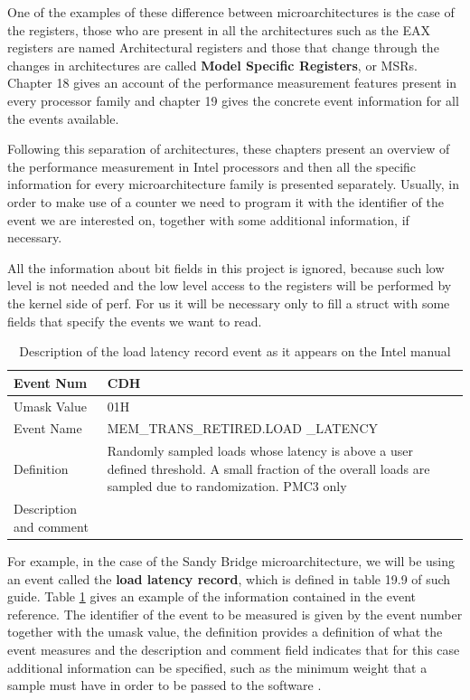 One of the examples of these difference between microarchitectures is the case of the registers, those who are present in all the architectures such as the EAX registers are named Architectural registers and those that change through the changes in architectures are called \textbf{Model Specific Registers}, or MSRs. Chapter 18 gives an account of the performance measurement features present in every processor family and chapter 19 gives the concrete event information for all the events available.

Following this separation of architectures, these chapters present an overview of the performance measurement in Intel processors and then all the specific information for every microarchitecture family is presented separately. Usually, in order to make use of a counter we need to program it with the identifier of the event we are interested on, together with some additional information, if necessary.

All the information about bit fields in this project is ignored, because such low level is not needed and the low level access to the registers will be performed by the kernel side of perf. For us it will be necessary only to fill a struct with some fields that specify the events we want to read.
\begin{table}
	\centering
		\begin{tabularx}{\textwidth}{|l|X|}
		\hline
			Event Num & CDH\\
			\hline
			Umask Value & 01H\\
			\hline
			Event Name & MEM\_TRANS\_RETIRED.LOAD \_LATENCY\\
			\hline
			Definition & Randomly sampled loads whose latency is above a user defined threshold. A small fraction of the overall loads are sampled due to randomization. PMC3 only\\
			Description and comment\\
			\hline
		\end{tabularx}
		\caption{Description of the load latency record event as it appears on the Intel manual}
		\label{table:lldescr}
\end{table}
For example, in the case of the Sandy Bridge microarchitecture, we will be using an event called the \textbf{load latency record}, which is defined in table 19.9 of such guide. Table \ref{table:lldescr} gives an example of the information contained in the event reference. The identifier of the event to be measured is given by the event number together with the umask value, the definition provides a definition of what the event measures and the description and comment field indicates that for this case additional information can be specified, such as the minimum weight that a sample must have in order to be passed to the software .

